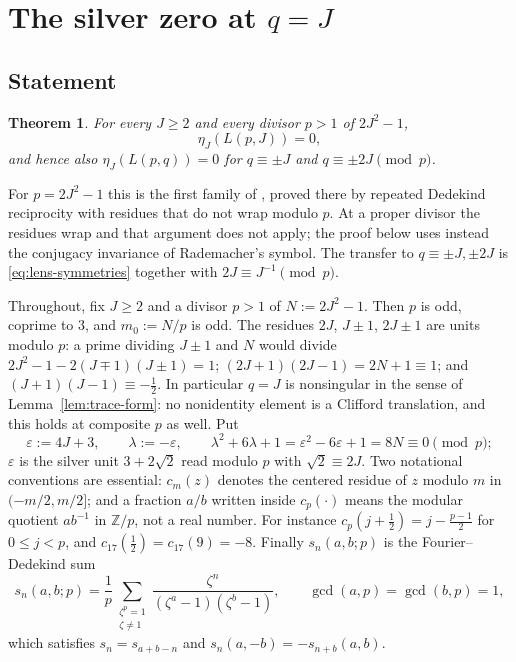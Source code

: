 \documentclass[11pt]{article}
\newtheorem{theorem}{Theorem}[section]
\theoremstyle{definition}
\newcommand{\Z}{\mathbb Z}
\begin{document}
\section{The silver zero at \texorpdfstring{$q=J$}{q = J}}
\label{sec:silver}

\subsection{Statement}

\begin{theorem}
\label{thm:C3}
For every $J\geq2$ and every divisor $p>1$ of $2J^2-1$,
\[
 \eta_J(L(p,J))=0,
\]
and hence also $\eta_J(L(p,q))=0$ for $q\equiv\pm J$ and $q\equiv\pm2J
\pmod p$.
\end{theorem}

For $p=2J^2-1$ this is the first family of
\cite[Thm.~7.1]{MahmoodP1Collection2026}, proved there by repeated
Dedekind reciprocity with residues that do not wrap modulo $p$.  At a
proper divisor the residues wrap and that argument does not apply; the
proof below uses instead the conjugacy invariance of Rademacher's symbol.
The transfer to $q\equiv\pm J,\pm2J$ is \eqref{eq:lens-symmetries}
together with $2J\equiv J^{-1}\pmod p$.

Throughout, fix $J\geq2$ and a divisor $p>1$ of $N:=2J^2-1$.  Then $p$
is odd, coprime to $3$, and $m_0:=N/p$ is odd.  The residues $2J$,
$J\pm1$, $2J\pm1$ are units modulo $p$: a prime dividing $J\pm1$ and $N$
would divide $2J^2-1-2(J\mp1)(J\pm1)=1$; $(2J+1)(2J-1)=2N+1\equiv1$; and
$(J+1)(J-1)\equiv-\tfrac12$.  In particular $q=J$ is nonsingular in the
sense of Lemma~\ref{lem:trace-form}: no nonidentity element is a
Clifford translation, and this holds at composite $p$ as well.  Put
\begin{equation}
 \varepsilon:=4J+3,\qquad\lambda:=-\varepsilon,\qquad
 \lambda^2+6\lambda+1=\varepsilon^2-6\varepsilon+1=8N\equiv0\pmod p;
 \label{eq:silver-unit}
\end{equation}
$\varepsilon$ is the silver unit $3+2\sqrt2$ read modulo $p$ with
$\sqrt2\equiv2J$.  Two notational conventions are essential: $c_m(z)$
denotes the centered residue of $z$ modulo $m$ in $(-m/2,m/2]$; and a
fraction $a/b$ written inside $c_p(\cdot)$ means the modular quotient
$ab^{-1}$ in $\Z/p$, not a real number.  For instance
$c_p(j+\tfrac12)=j-\tfrac{p-1}2$ for $0\leq j<p$, and
$c_{17}(\tfrac12)=c_{17}(9)=-8$.  Finally $s_n(a,b;p)$ is the
Fourier--Dedekind sum \cite{BeckRobins2004}
\[
 s_n(a,b;p)=\frac1p\sum_{\substack{\zeta^p=1\\\zeta\neq1}}
 \frac{\zeta^n}{(\zeta^a-1)(\zeta^b-1)},\qquad\gcd(a,p)=\gcd(b,p)=1,
\]
which satisfies $s_n=s_{a+b-n}$ and $s_n(a,-b)=-s_{n+b}(a,b)$.
\end{document}

